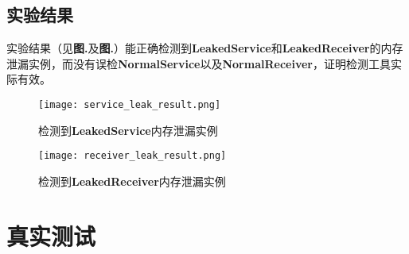 \subsection{实验结果}
实验结果（见\textbf{图.}\redbf{\ref{fig:result of mock receiver}}及\textbf{图.}\redbf{\ref{fig:result of mock service}}）能正确检测到\textbf{LeakedService}和\textbf{LeakedReceiver}的内存泄漏实例，而没有误检\textbf{NormalService}以及\textbf{NormalReceiver}，证明检测工具实际有效。

\begin{figure}[htbp]
	\centering
	\texttt{[image: service\_leak\_result.png]} %
	\caption{检测到\textbf{LeakedService}内存泄漏实例}
	\label{fig:result of mock service}
\end{figure}
\begin{figure}[htbp]
\centering
\texttt{[image: receiver\_leak\_result.png]} %
\caption{检测到\textbf{LeakedReceiver}内存泄漏实例}
\label{fig:result of mock receiver}
\end{figure}

\section{真实测试}

